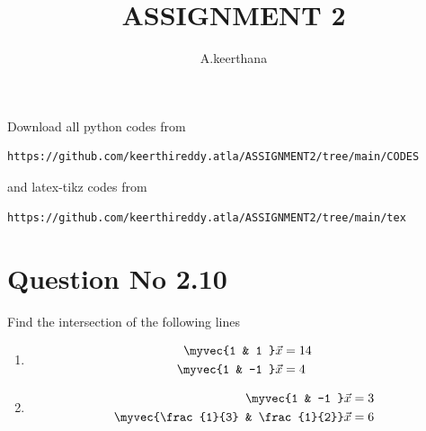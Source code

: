 \documentclass[journal,12pt,twocolumn]{IEEEtran}
\begin{document}
     \def\rightbox#1{\makebox[0in][r]{#1}}
     \def\centbox#1{\makebox[0in]{#1}}
     \def\topbox#1{\raisebox{-\baselineskip}[0in][0in]{#1}}
     \def\midbox#1{\raisebox{-0.5\baselineskip}[0in][0in]{#1}}
\vspace{3cm}
\title{ASSIGNMENT 2}
\author{A.keerthana}
\maketitle
\newpage
\bigskip
\renewcommand{\thefigure}{\theenumi}
\renewcommand{\thetable}{\theenumi}
Download all python codes from 
\begin{lstlisting}
https://github.com/keerthireddy.atla/ASSIGNMENT2/tree/main/CODES
\end{lstlisting}
%
and latex-tikz codes from 
%
\begin{lstlisting}
https://github.com/keerthireddy.atla/ASSIGNMENT2/tree/main/tex
\end{lstlisting}
%
\section{Question No 2.10}
Find the intersection of the following lines
%
\begin{enumerate}
\item
\begin{align}
\begin{split}
\myvec{1 & 1 }\vec{x}&=14
\\
\myvec{1 & -1 }\vec{x}&=4 \label{1.0.1}
\end{split}
\end{align}
\item
\begin{align}
\begin{split}
\myvec{1 & -1 }\vec{x}&=3
\\
\myvec{\frac{1}{3} & \frac{1}{2}}\vec{x}&=6 \label{1.0.2}
\end{split}
\end{align}
\end{enumerate}
%
\end{document}
